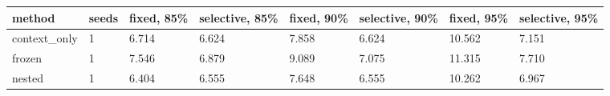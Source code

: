 \begin{tabular}{llllllll}
\hline
method & seeds & fixed, 85\% & selective, 85\% & fixed, 90\% & selective, 90\% & fixed, 95\% & selective, 95\% \\
\hline
context\_only & 1 & 6.714 & 6.624 & 7.858 & 6.624 & 10.562 & 7.151 \\
frozen & 1 & 7.546 & 6.879 & 9.089 & 7.075 & 11.315 & 7.710 \\
nested & 1 & 6.404 & 6.555 & 7.648 & 6.555 & 10.262 & 6.967 \\
\hline
\end{tabular}
